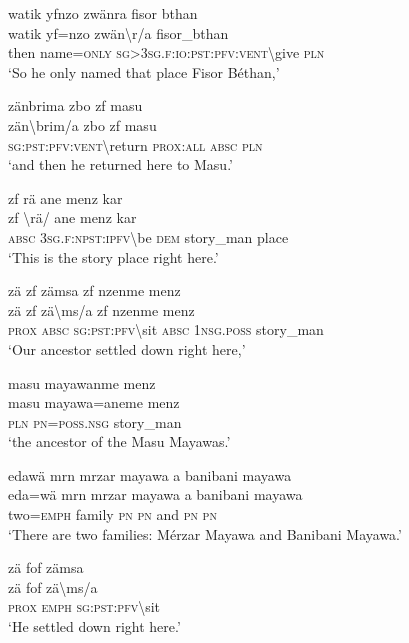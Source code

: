 \ea\label{ex:2:a1651}
watik yfnzo zwänra fisor bthan\\
\gll watik	yf=nzo	zwän{\textbackslash}r/a	fisor\_bthan\\
     then	name=\textsc{only}	\textsc{sg}>3\textsc{sg}.\textsc{f}:\textsc{io}:\textsc{pst}:\textsc{pfv}:\textsc{vent}{\textbackslash}give	\textsc{pln}\\
\glt `So he only named that place Fisor Béthan,'
\z

\ea\label{ex:2:a1652}
zänbrima zbo zf masu\\
\gll zän{\textbackslash}brim/a	zbo	zf	masu\\
     \textsc{sg}:\textsc{pst}:\textsc{pfv}:\textsc{vent}{\textbackslash}return	\textsc{prox}:\textsc{all}	\textsc{absc}	\textsc{pln}\\
\glt `and then he returned here to Masu.'
\z

\ea\label{ex:2:a1654}
zf rä ane menz kar\\
\gll zf	{\textbackslash}rä/	ane	menz	kar\\
     \textsc{absc}	3\textsc{sg}.\textsc{f}:\textsc{npst}:\textsc{ipfv}{\textbackslash}be	\textsc{dem}	story\_man	place\\
\glt `This is the story place right here.'
\z

\ea\label{ex:2:a1655}
zä zf zämsa zf nzenme menz\\
\gll zä	zf	zä{\textbackslash}ms/a	zf	nzenme	menz\\
     \textsc{prox}	\textsc{absc}	\textsc{sg}:\textsc{pst}:\textsc{pfv}{\textbackslash}sit	\textsc{absc}	1\textsc{nsg}.\textsc{poss}	story\_man\\
\glt `Our ancestor settled down right here,'
\z

\ea\label{ex:2:a1657}
masu mayawanme menz\\
\gll masu	mayawa=aneme	menz\\
     \textsc{pln}	\textsc{pn}=\textsc{poss}.\textsc{nsg}	story\_man\\
\glt `the ancestor of the Masu Mayawas.'
\z

\ea\label{ex:2:a1658}
edawä mrn mrzar mayawa a banibani mayawa\\
\gll eda=wä	mrn	mrzar	mayawa	a	banibani	mayawa\\
     two=\textsc{emph}	family	\textsc{pn}	\textsc{pn}	and	\textsc{pn}	\textsc{pn}\\
\glt `There are two families: Mérzar Mayawa and Banibani Mayawa.'
\z

\ea\label{ex:2:a1661}
zä fof zämsa\\
\gll zä	fof	zä{\textbackslash}ms/a\\
     \textsc{prox}	\textsc{emph}	\textsc{sg}:\textsc{pst}:\textsc{pfv}{\textbackslash}sit\\
\glt `He settled down right here.'
\z

